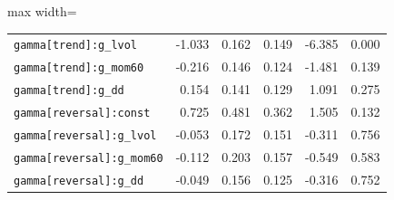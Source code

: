 \begin{table}[!htbp]
\begin{adjustbox}{max width=\textwidth}
\begin{tabular}{lrrrrr}
\texttt{gamma[trend]:g\_lvol} & -1.033 & 0.162 & 0.149 & -6.385 & 0.000\\
\texttt{gamma[trend]:g\_mom60} & -0.216 & 0.146 & 0.124 & -1.481 & 0.139\\
\texttt{gamma[trend]:g\_dd} & 0.154 & 0.141 & 0.129 & 1.091 & 0.275\\
\texttt{gamma[reversal]:const} & 0.725 & 0.481 & 0.362 & 1.505 & 0.132\\
\texttt{gamma[reversal]:g\_lvol} & -0.053 & 0.172 & 0.151 & -0.311 & 0.756\\
\texttt{gamma[reversal]:g\_mom60} & -0.112 & 0.203 & 0.157 & -0.549 & 0.583\\
\texttt{gamma[reversal]:g\_dd} & -0.049 & 0.156 & 0.125 & -0.316 & 0.752\\
\bottomrule
\end{tabular}
\end{adjustbox}
\end{table}